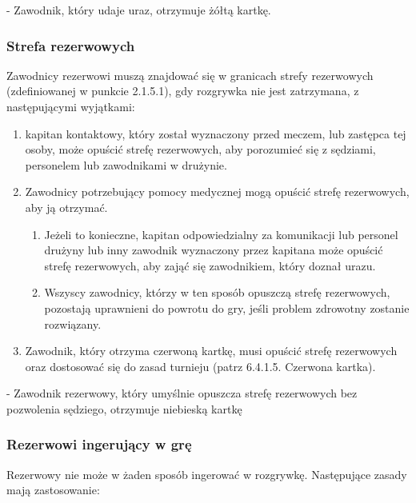 \documentclass[12pt]{article}
\newcommand\yellowcard{\bgroup\color{yellow}\markoverwith{\textcolor{yellow}{\rule[-0.5ex]{2pt}{0.4pt}}}\ULon}
\newcommand\bluecard{\bgroup\color{blue}\markoverwith{\textcolor{blue}{\rule[-0.5ex]{2pt}{0.4pt}}}\ULon}
\begin{document}
\yellowcard{Żółta kartka} - Zawodnik, który udaje uraz, otrzymuje żółtą
kartkę.

\subsubsection{Strefa rezerwowych}

Zawodnicy rezerwowi muszą znajdować się w granicach strefy rezerwowych
(zdefiniowanej w punkcie 2.1.5.1), gdy rozgrywka nie jest zatrzymana, z
następującymi wyjątkami:

\begin{enumerate}
	\item
	      kapitan kontaktowy, który został wyznaczony przed meczem, lub zastępca
	      tej osoby, może opuścić strefę rezerwowych, aby porozumieć się z
	      sędziami, personelem lub zawodnikami w drużynie.
	\item
	      Zawodnicy potrzebujący pomocy medycznej mogą opuścić strefę
	      rezerwowych, aby ją otrzymać.

	      \begin{enumerate}
		      \item
		            Jeżeli to konieczne, kapitan odpowiedzialny za komunikacji lub
		            personel drużyny lub inny zawodnik wyznaczony przez kapitana może
		            opuścić strefę rezerwowych, aby zająć się zawodnikiem, który doznał
		            urazu.
		      \item
		            Wszyscy zawodnicy, którzy w ten sposób opuszczą strefę rezerwowych,
		            pozostają uprawnieni do powrotu do gry, jeśli problem zdrowotny
		            zostanie rozwiązany.
	      \end{enumerate}
	\item
	      Zawodnik, który otrzyma czerwoną kartkę, musi opuścić strefę
	      rezerwowych oraz dostosować się do zasad turnieju (patrz 6.4.1.5.
	      Czerwona kartka).
\end{enumerate}

\bluecard{Niebieska kartka} - Zawodnik rezerwowy, który umyślnie opuszcza
strefę rezerwowych bez pozwolenia sędziego, otrzymuje niebieską kartkę

\subsubsection{Rezerwowi ingerujący w grę}

Rezerwowy nie może w żaden sposób ingerować w rozgrywkę. Następujące
zasady mają zastosowanie:
\end{document}
